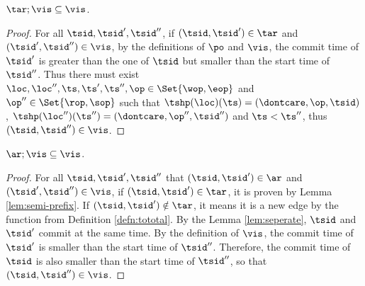 \begin{lem}
    \label{lem:semi-prefix}
    \( \tar; \vis \subseteq \vis \).
\end{lem}
\begin{proof}
    For all \( \tsid, \tsid', \tsid'' \), if \( (\tsid, \tsid') \in \tar \) and \( (\tsid', \tsid'') \in \vis \), by the definitions of \( \po \) and \( \vis \), the commit time of \( \tsid' \) is greater than the one of \( \tsid \) but smaller than the start time of \( \tsid'' \).
    Thus there must exist \( \loc, \loc'', \ts, \ts' , \ts'', \op \in \Set{\wop, \eop}  \) and \( \op'' \in \Set{\rop, \sop } \) such that  \( \tshp(\loc)(\ts) = (\dontcare, \op, \tsid) \), \( \tshp(\loc'')(\ts'') = (\dontcare, \op'', \tsid'') \) and \( \ts < \ts'' \), thus \( ( \tsid, \tsid'' ) \in \vis \).
\end{proof}

\begin{lem}[Prefix]
    \label{lem:prefix}
    \( \ar; \vis \subseteq \vis \).
\end{lem}
\begin{proof}
    For all \( \tsid, \tsid', \tsid'' \) that \( (\tsid, \tsid') \in \ar \) and \( (\tsid', \tsid'') \in \vis \), if \( (\tsid, \tsid') \in \tar \), it is proven by Lemma \ref{lem:semi-prefix}.
    If \( ( \tsid, \tsid' ) \notin \tar \), it means it is a new edge by the  function from Definition \ref{defn:tototal}.
    By the Lemma \ref{lem:seperate}, \( \tsid \) and \( \tsid' \) commit at the same time.
    By the definition of \( \vis \), the commit time of \( \tsid' \) is smaller than the start time of \( \tsid'' \).
    Therefore, the commit time of \( \tsid \) is also smaller than the start time of \( \tsid'' \), so that \( ( \tsid, \tsid'' ) \in \vis \).
\end{proof}

